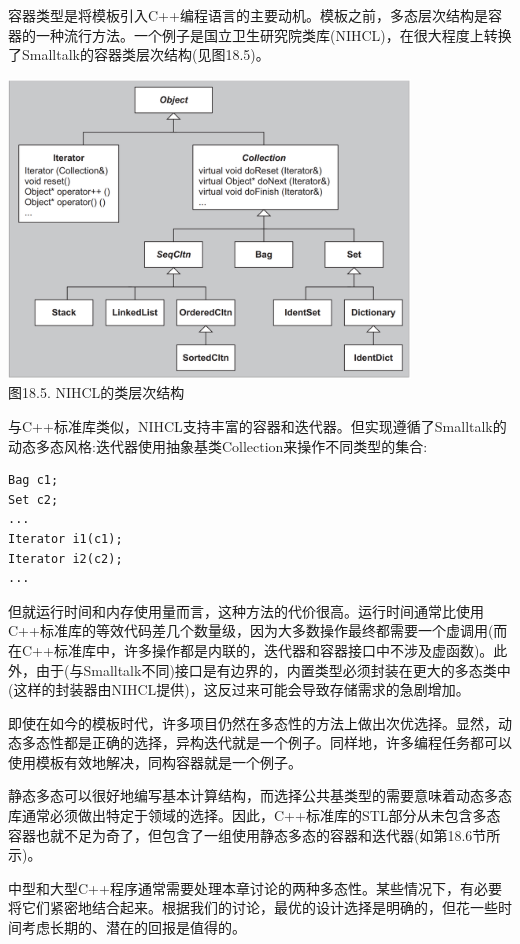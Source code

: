 容器类型是将模板引入C++编程语言的主要动机。模板之前，多态层次结构是容器的一种流行方法。一个例子是国立卫生研究院类库(NIHCL)，在很大程度上转换了Smalltalk的容器类层次结构(见图18.5)。

\begin{center}
\includegraphics[width=0.8\textwidth]{content/3/chapter18/images/5.png} \\
图18.5. NIHCL的类层次结构
\end{center}

与C++标准库类似，NIHCL支持丰富的容器和迭代器。但实现遵循了Smalltalk的动态多态风格:迭代器使用抽象基类Collection来操作不同类型的集合:

\begin{lstlisting}[style=styleCXX]
Bag c1;
Set c2;
...
Iterator i1(c1);
Iterator i2(c2);
...
\end{lstlisting}

但就运行时间和内存使用量而言，这种方法的代价很高。运行时间通常比使用C++标准库的等效代码差几个数量级，因为大多数操作最终都需要一个虚调用(而在C++标准库中，许多操作都是内联的，迭代器和容器接口中不涉及虚函数)。此外，由于(与Smalltalk不同)接口是有边界的，内置类型必须封装在更大的多态类中(这样的封装器由NIHCL提供)，这反过来可能会导致存储需求的急剧增加。

即使在如今的模板时代，许多项目仍然在多态性的方法上做出次优选择。显然，动态多态性都是正确的选择，异构迭代就是一个例子。同样地，许多编程任务都可以使用模板有效地解决，同构容器就是一个例子。

静态多态可以很好地编写基本计算结构，而选择公共基类型的需要意味着动态多态库通常必须做出特定于领域的选择。因此，C++标准库的STL部分从未包含多态容器也就不足为奇了，但包含了一组使用静态多态的容器和迭代器(如第18.6节所示)。

中型和大型C++程序通常需要处理本章讨论的两种多态性。某些情况下，有必要将它们紧密地结合起来。根据我们的讨论，最优的设计选择是明确的，但花一些时间考虑长期的、潜在的回报是值得的。





















